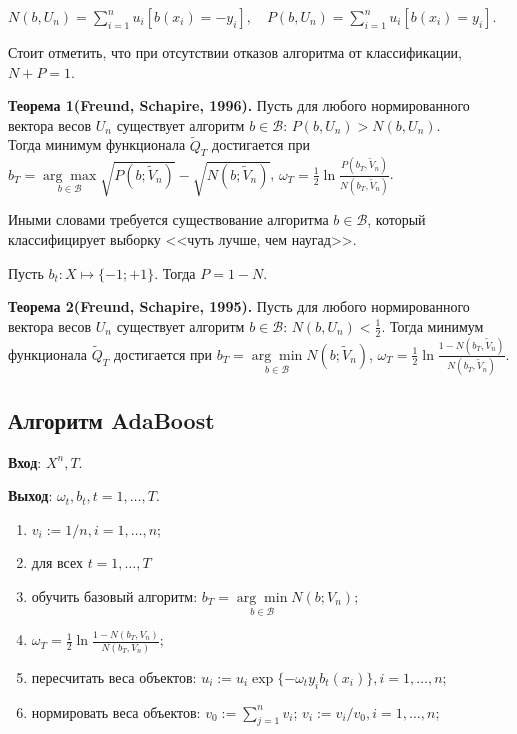 \documentclass[specialist, 12pt, href]{article}
\begin{document}
$N(b, U_n) = \sum\limits_{i = 1}^n  u_i[b(x_i) = -y_i], \quad P(b, U_n) = \sum\limits_{i = 1}^n  u_i[b(x_i) = y_i].$

Стоит отметить, что при отсутствии отказов алгоритма от классификации, $N + P = 1$.

\textbf{Теорема 1(Freund, Schapire, 1996).} Пусть для любого нормированного вектора весов $ U_n$ существует алгоритм $b \in \mathcal{B}$: $P(b, U_n) > N(b, U_n)$. \\
Тогда минимум функционала $\tilde Q_T$ достигается при
$b_T =  \underset{b  \in \mathcal{B}}{\arg\max} \sqrt{P(b;\tilde V_n)} - \sqrt{N(b;\tilde V_n)}$, $\omega_T = \frac{1}{2} \ln\frac{P(b_T,\tilde V_n)}{N(b_T,\tilde V_n)}$.

Иными словами требуется существование алгоритма $b \in \mathcal{B}$, который классифицирует выборку <<чуть лучше, чем наугад>>.


Пусть $b_t: X \mapsto \{-1;+1\}$. Тогда $P = 1 - N$.

\textbf{Теорема 2(Freund, Schapire, 1995).} Пусть для любого нормированного вектора весов $ U_n$ существует алгоритм $b \in \mathcal{B}$: $N(b, U_n) < \frac{1}{2}$.
Тогда минимум функционала $\tilde Q_T$ достигается при 
$b_T =  \underset{b  \in \mathcal{B}}{\arg\min} N(b;\tilde V_n)$, $\omega_T = \frac{1}{2} \ln\frac{1 - N(b_T,\tilde V_n)}{N(b_T,\tilde V_n)}$.

\subsection*{Алгоритм AdaBoost}

{\bf {Вход}}: $X^n, T$.

{\bf {Выход}}: $\omega_t, b_t, t = 1,\dots,T$.
\begin{enumerate}
   \item $v_i := 1/n, i = 1,\dots,n$;
   \item для всех $t = 1,\dots,T$
   \item \quad обучить базовый алгоритм: $b_T =  \underset{b  \in \mathcal{B}}{\arg\min} N(b;V_n)$;
   \item \quad $\omega_T = \frac{1}{2} \ln\frac{1 - N(b_T,V_n)}{N(b_T, V_n)}$;
   \item \quad пересчитать веса объектов: $u_i := u_i \exp\{-\omega_t y_i b_t(x_i)\}, i = 1,\dots,n$;
   \item \quad нормировать веса объектов: $v_0 := \sum\limits_{j=1}^n v_i$; $v_i := v_i/v_0, i = 1,\dots,n$;
\end{enumerate}
\end{document}
